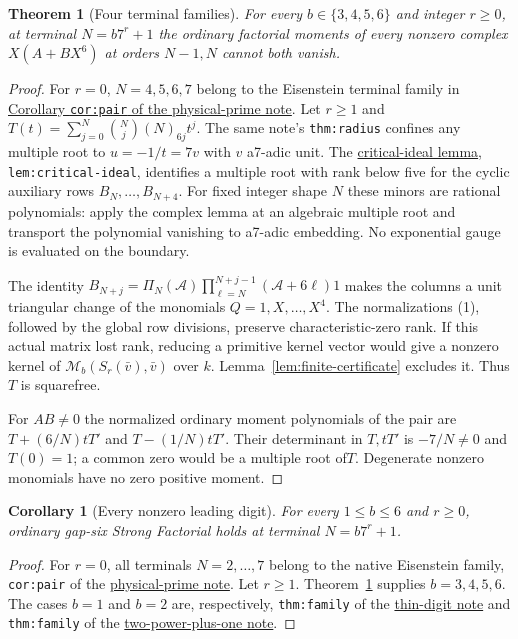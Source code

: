 \documentclass[11pt]{article}
\newtheorem{theorem}[lemma]{Theorem}
\newtheorem{corollary}[lemma]{Corollary}
\begin{document}
\begin{theorem}[Four terminal families]\label{thm:families}
For every $b\in\{3,4,5,6\}$ and integer $r\ge0$, at terminal
$N=b7^r+1$ the ordinary factorial moments of every nonzero complex
$X(A+BX^6)$ at orders $N-1,N$ cannot both vanish.
\end{theorem}
\begin{proof}
For $r=0$, $N=4,5,6,7$ belong to the Eisenstein terminal family
in \href{PHYSICAL_PRIME_TOTAL_DEGREE_REDUCTION.tex}
{Corollary \texttt{cor:pair} of the physical-prime note}.
Let $r\ge1$ and
$T(t)=\sum_{j=0}^N\binom Nj(N)_{6j}t^j$.
The same note's \texttt{thm:radius} confines any multiple root
to $u=-1/t=7v$ with $v$ a7-adic unit.
The \href{gap_three_hurwitz_structure.tex}{critical-ideal lemma},
\texttt{lem:critical-ideal}, identifies a multiple root with rank
below five for the cyclic auxiliary rows $B_N,\ldots,B_{N+4}$.
For fixed integer shape $N$ these minors are rational polynomials:
apply the complex lemma at an algebraic multiple root and transport
the polynomial vanishing to a7-adic embedding.
No exponential gauge is evaluated on the boundary.

The identity
$B_{N+j}=\Pi_N(\mathcal A)
 \prod_{\ell=N}^{N+j-1}(\mathcal A+6\ell)1$
makes the columns a unit triangular change of the monomials
$Q=1,X,\ldots,X^4$.
The normalizations (1), followed by the global row divisions,
preserve characteristic-zero rank.
If this actual matrix lost rank, reducing a primitive kernel vector
would give a nonzero kernel of
$\mathcal M_b(S_r(\bar v),\bar v)$ over $k$.
Lemma~\ref{lem:finite-certificate} excludes it.
Thus $T$ is squarefree.

For $AB\ne0$ the normalized ordinary moment polynomials of the pair
are $T+(6/N)tT'$ and $T-(1/N)tT'$.
Their determinant in $T,tT'$ is $-7/N\ne0$ and $T(0)=1$;
a common zero would be a multiple root of$T$.
Degenerate nonzero monomials have no zero positive moment.
\end{proof}

\begin{corollary}[Every nonzero leading digit]\label{cor:scaled-family}
For every $1\le b\le6$ and $r\ge0$, ordinary gap-six Strong
Factorial holds at terminal $N=b7^r+1$.
\end{corollary}
\begin{proof}
For $r=0$, all terminals $N=2,\ldots,7$ belong to the native
Eisenstein family, \texttt{cor:pair} of the
\href{PHYSICAL_PRIME_TOTAL_DEGREE_REDUCTION.tex}{physical-prime note}.
Let $r\ge1$. Theorem~\ref{thm:families} supplies $b=3,4,5,6$.
The cases $b=1$ and $b=2$ are, respectively,
\texttt{thm:family} of the
\href{GAP_SIX_THIN_DIGIT_SFC.tex}{thin-digit note} and
\texttt{thm:family} of the
\href{GAP_SIX_TWO_POWER_PLUS_ONE_SFC.tex}{two-power-plus-one note}.
\end{proof}
\end{document}
